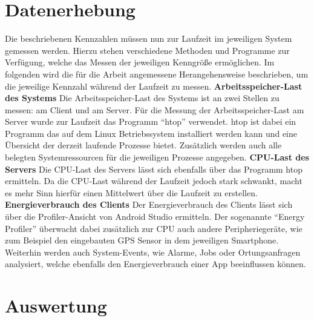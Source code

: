 \section{Datenerhebung}
Die beschriebenen Kennzahlen müssen nun zur Laufzeit im jeweiligen System gemessen werden.
Hierzu stehen verschiedene Methoden und Programme zur Verfügung, welche das Messen der jeweiligen Kenngröße ermöglichen.
Im folgenden wird die für die Arbeit angemessene Herangehensweise beschrieben, um die jeweilige Kennzahl während der Laufzeit zu messen.\newline\newline
\textbf{Arbeitsspeicher-Last des Systems}\newline
Die Arbeitsspeicher-Last des Systems ist an zwei Stellen zu messen: am Client und am Server.
Für die Messung der Arbeitsspeicher-Last am Server wurde zur Laufzeit das Programm "`htop"' verwendet.
htop ist dabei ein Programm das auf dem Linux Betriebssystem installiert werden kann und eine Übersicht der derzeit laufende Prozesse bietet.
Zusätzlich werden auch alle belegten Systemressourcen für die jeweiligen Prozesse angegeben.\newline\newline
\textbf{CPU-Last des Servers}\newline
Die CPU-Last des Servers lässt sich ebenfalls über das Programm htop ermitteln. 
Da die CPU-Last während der Laufzeit jedoch stark schwankt, macht es mehr Sinn hierfür einen Mittelwert über die Laufzeit zu erstellen.\newline\newline
\textbf{Energieverbrauch des Clients}\newline
Der Energieverbrauch des Clients lässt sich über die Profiler-Ansicht von Android Studio ermitteln.
Der sogenannte "`Energy Profiler"' überwacht dabei zusätzlich zur CPU auch andere Peripheriegeräte, wie zum Beispiel den eingebauten GPS Sensor in dem jeweiligen Smartphone.
Weiterhin werden auch System-Events, wie Alarme, Jobs oder Ortungsanfragen analysiert, welche ebenfalls den Energieverbrauch einer App beeinflussen können.\newline\newline

\newpage


\section{Auswertung}
